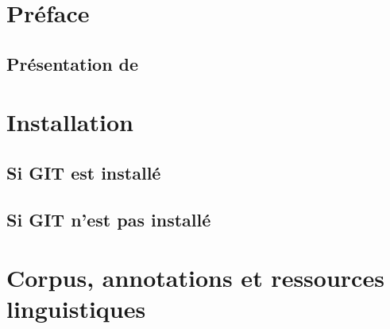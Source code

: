 \documentclass[12pt]{article}
\title{\SEMFull}
\date{}
\begin{document}
    \maketitle
    
    \tableofcontents
    \newpage
    
    \section{Préface}
    \label{sec:preface}
    
        \subsection{Présentation de \SEM}
        \label{subsec:presentation}
        
    
    \section{Installation}
    \label{sec:installation}
    

        \subsection{Si GIT est installé}
        \label{ssubec:git-installed}
        

        \subsection{Si GIT n'est pas installé}
        \label{subsec:git-not-installed}
        

        \subsection{\Wapiti}
        \label{subsec:wapiti}
        
    
    \section{Corpus, annotations et ressources linguistiques}
    \label{sec:corpus-annotations-resources}

        \subsection{\FTBFull}
        \label{subsec:ftb}
        
\end{document}
